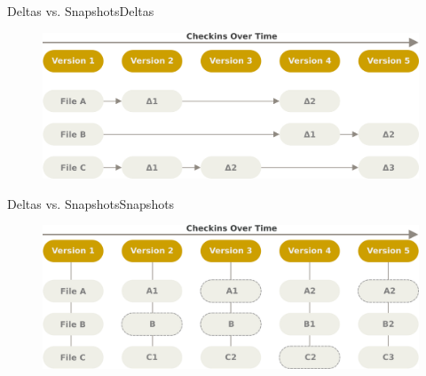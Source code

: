 \documentclass{beamer}
\begin{document}
\begin{frame}{Deltas vs. Snapshots}{Deltas}
\begin{figure}
	\centering
	\includegraphics[width=1\textwidth]{deltas}
\end{figure}
\end{frame}

\begin{frame}{Deltas vs. Snapshots}{Snapshots}
\begin{figure}
	\centering
	\includegraphics[width=1\textwidth]{snapshots}
\end{figure}
\end{frame}
\end{document}
